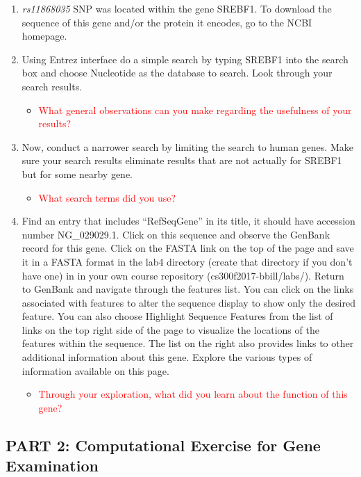 \begin{enumerate}
	\item \emph{rs11868035} SNP was located within the gene SREBF1. To download the sequence of this gene and/or the protein it encodes, go to the NCBI homepage. 
	\item Using Entrez interface do a simple search by typing SREBF1 into the search box and choose Nucleotide as the database to search. Look through your search results. 
	\begin{itemize}
		\item \textcolor{red}{What general observations can you make regarding the usefulness of your results?}
	\end{itemize}
	\item Now, conduct a narrower search by limiting the search to human genes. Make sure your search results eliminate results that are not actually for SREBF1 but for some nearby gene. 
	\begin{itemize}
		\item  \textcolor{red}{What search terms did you use?}
	\end{itemize}
	\item Find an entry that includes ``RefSeqGene'' in its title, it should have accession number NG\_029029.1. Click on this sequence and observe the GenBank record for this gene. Click on the FASTA link on the top of the page and save it in a FASTA format in the lab4 directory (create that directory if you don't have one) in in your own course repository (cs300f2017-bbill/labs/). Return to GenBank and navigate through the features list. You can click on the links associated with features to alter the sequence display to show only the desired feature. You can also choose Highlight Sequence Features from the list of links on the top right side of the page to visualize the locations of the features within the sequence. The list on the right also provides links to other additional information about this gene. Explore the various types of information available on this page. 
	\begin{itemize}
		\item \textcolor{red}{Through your exploration, what did you learn about the function of this gene?}
	\end{itemize}
\end{enumerate}


\vspace*{-.1in}
\subsection*{PART 2: Computational Exercise for Gene Examination}
\vspace*{-.1in} 

